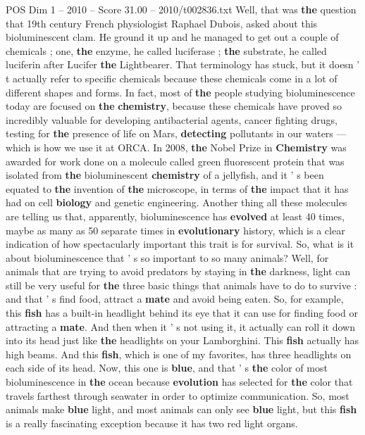 \begin{textsample}{POS Dim 1 – 2010 – Score 31.00 – 2010/t002836.txt}
Well, that was \textbf{the} question that 19th century French physiologist Raphael Dubois, asked about this bioluminescent clam.
He ground it up and he managed to get out a couple of chemicals ; one, \textbf{the} enzyme, he called luciferase ; \textbf{the} substrate, he called luciferin after Lucifer \textbf{the} Lightbearer.
That terminology has stuck, but it doesn ' t actually refer to specific chemicals because these chemicals come in a lot of different shapes and forms.
In fact, most of \textbf{the} people studying bioluminescence today are focused on \textbf{the} \textbf{chemistry}, because these chemicals have proved so incredibly valuable for developing antibacterial agents, cancer fighting drugs, testing for \textbf{the} presence of life on Mars, \textbf{detecting} pollutants in our waters — which is how we use it at ORCA.
In 2008, \textbf{the} Nobel Prize in \textbf{Chemistry} was awarded for work done on a molecule called green fluorescent protein that was isolated from \textbf{the} bioluminescent \textbf{chemistry} of a jellyfish, and it ' s been equated to \textbf{the} invention of \textbf{the} microscope, in terms of \textbf{the} impact that it has had on cell \textbf{biology} and genetic engineering.
Another thing all these molecules are telling us that, apparently, bioluminescence has \textbf{evolved} at least 40 times, maybe as many as 50 separate times in \textbf{evolutionary} history, which is a clear indication of how spectacularly important this trait is for survival.
So, what is it about bioluminescence that ' s so important to so many animals?
Well, for animals that are trying to avoid predators by staying in \textbf{the} darkness, light can still be very useful for \textbf{the} three basic things that animals have to do to survive : and that ' s find food, attract a \textbf{mate} and avoid being eaten.
So, for example, this \textbf{fish} has a built-in headlight behind its eye that it can use for finding food or attracting a \textbf{mate}.
And then when it ' s not using it, it actually can roll it down into its head just like \textbf{the} headlights on your Lamborghini.
This \textbf{fish} actually has high beams.
And this \textbf{fish}, which is one of my favorites, has three headlights on each side of its head.
Now, this one is \textbf{blue}, and that ' s \textbf{the} color of most bioluminescence in \textbf{the} ocean because \textbf{evolution} has selected for \textbf{the} color that travels farthest through seawater in order to optimize communication.
So, most animals make \textbf{blue} light, and most animals can only see \textbf{blue} light, but this \textbf{fish} is a really fascinating exception because it has two red light organs.

\end{textsample}
